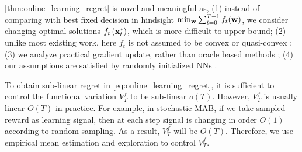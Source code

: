 \cref{thm:online_learning_regret} is novel and meaningful as, (1) instead of comparing with best fixed decision in hindsight $\min_{{\mathbf{w}}}{\sum_{t=0}^{T-1}{f_t({\mathbf{w}})} }$, we consider changing optimal solutions $f_t\left( {\mathbf{x}}_t^* \right)$, which is more difficult to upper bound; (2) unlike most existing work, here $f_t$ is not assumed to be convex \citep{yang2016tracking} or quasi-convex \citep{gao2018online}; (3) we analyze practical gradient update, rather than oracle based methods \citep{suggala2019online,agarwal2019learning} ; (4) our assumptions are satisfied by randomly initialized NNs \citep{li2018learning,allen2018convergenceB}.

To obtain sub-linear regret in \cref{eq:online_learning_regret}, it is sufficient to control the functional variation $V_T^f$ to be sub-linear $o(T)$. However, $V_T^f$ is usually linear $O(T)$ in practice. For example, in stochastic MAB, if we take sampled reward as learning signal, then at each step signal is changing in order $O(1)$ according to random sampling. As a result, $V_T^f$ will be $O(T)$. Therefore, we use empirical mean estimation and exploration to control $V_T^f$.
